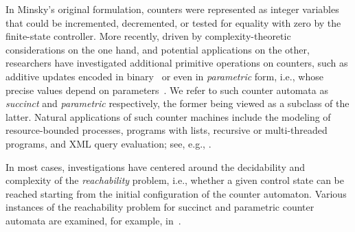 \documentclass[times,envcountsame]{llncs}
\begin{document}
In Minsky's original formulation, counters were represented as integer
variables that could be incremented, decremented, or tested for
equality with zero by the finite-state controller. More recently,
driven by complexity-theoretic considerations on the one hand, and
potential applications on the other, researchers have investigated
additional primitive operations on counters, such as additive updates
encoded in binary~\cite{BHIMV06,LS08-atva} or even
in \emph{parametric} form, i.e., whose precise values depend on
parameters~\cite{BIL06-icalp,IJTW93-icalp}. We refer to such counter automata as
\emph{succinct} and \emph{parametric} respectively, the former being
viewed as a subclass of the latter. Natural applications of such
counter machines include the modeling of resource-bounded processes,
programs with lists, recursive or multi-threaded programs, and XML
query evaluation; see, e.g.,
\cite{ID06-tcs,BHIMV06,CR04}.

In most cases, investigations have centered around the decidability
and complexity of the \emph{reachability} problem, i.e., whether a
given control state can be reached starting from the initial
configuration of the counter automaton. Various instances of the
reachability problem for succinct and parametric counter automata are
examined, for example, in~\cite{DG-jlc09,HKOW10,IJTW93-icalp}.
\end{document}
